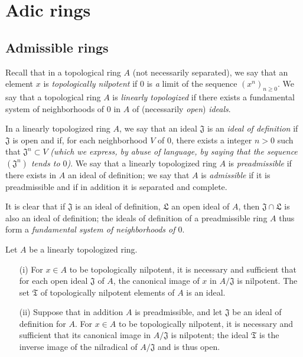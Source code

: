 \section{Adic rings}
\label{section:0.7}

\subsection{Admissible rings}
\label{subsection:0.7.1}

\begin{env}[7.1.1]
\label{0.7.1.1}
Recall that in a topological ring $A$ (not necessarily separated), we say that an element $x$
is \emph{topologically nilpotent} if $0$ is \emph{a} limit of the sequence
$(x^n)_{n\geq 0}$. We say that a topological ring $A$ is \emph{linearly topologized} if
there exists a fundamental system of neighborhoods of $0$ in $A$ of (necessarily \emph{open})
\emph{ideals}.
\end{env}

\begin{definition}[7.1.2]
\label{0.7.1.2}
In a linearly topologized ring $A$, we say that an ideal $\mathfrak{J}$ is an \emph{ideal of
definition} if $\mathfrak{J}$ is open and if, for each neighborhood $V$ of $0$, there exists
a integer $n>0$ such
that $\mathfrak{J}^n\subset V$ \emph{(which we express, by abuse of language, by saying that
the sequence $(\mathfrak{J}^n)$ \emph{tends to $0$})}. We say that a linearly topologized
ring $A$ is \emph{preadmissible} if there exists in $A$ an ideal of definition; we say that
$A$ is \emph{admissible} if it is preadmissible and if in addition it is separated and
complete.
\end{definition}

It is clear that if $\mathfrak{J}$ is an ideal of definition, $\mathfrak{L}$ an open ideal of
$A$, then $\mathfrak{J}\cap\mathfrak{L}$ is also an ideal of definition; the ideals of
definition of a preadmissible ring $A$ thus form a \emph{fundamental system of neighborhoods
of $0$}.

\begin{lemma}[7.1.3]
\label{0.7.1.3}
Let $A$ be a linearly topologized ring.
\begin{enumerate}
  \item[{\rm(i)}] For $x\in A$ to be topologically nilpotent, it is necessary and sufficient that for
    each open ideal $\mathfrak{J}$ of $A$, the canonical image of $x$ in $A/\mathfrak{J}$ is
    nilpotent. The set $\mathfrak{T}$ of topologically nilpotent elements of $A$ is an ideal.
  \item[{\rm(ii)}] Suppose that in addition $A$ is preadmissible, and let $\mathfrak{J}$ be an ideal
    of definition for $A$. For $x\in A$ to be topologically nilpotent, it is necessary and
    sufficient that its canonical image in $A/\mathfrak{J}$ is nilpotent; the ideal
    $\mathfrak{T}$ is the inverse image of the nilradical of $A/\mathfrak{J}$ and is thus open.
\end{enumerate}
\end{lemma}

